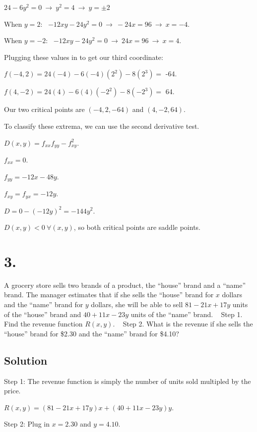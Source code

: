 \documentclass[]{article}
\begin{document}
\(24 - 6y^2 = 0 \ \to \ y^2 = 4 \ \to \ y = \pm 2\)

When \(y = 2\): ~\(-12xy -24y^2 = 0 \ \to \ -24x = 96 \ \to \ x = -4\).

When \(y = -2\): ~\(-12xy -24y^2 = 0 \ \to \ 24x = 96 \ \to \ x = 4\).

Plugging these values in to get our third coordinate:

\(f(-4,2) = 24(-4) - 6(-4)(2^2) - 8(2^3) =\) -64.

\(f(4,-2) = 24(4) - 6(4)(-2^2) - 8(-2^3) =\) 64.

Our two critical points are \((-4,2,-64)\) and \((4,-2,64)\).

To classify these extrema, we can use the second derivative test.

\(D(x,y) = f_{xx}f_{yy} - f_{xy}^2\).

\(f_{xx} = 0\).

\(f_{yy} = -12x - 48y\).

\(f_{xy} = f_{yx} = -12y\).

\(D = 0 - (-12y)^2 = -144y^2\).

\(D(x,y) < 0 \ \forall (x,y)\), so both critical points are saddle
points.

\hypertarget{section-2}{%
\section{3.}\label{section-2}}

A grocery store sells two brands of a product, the ``house'' brand and a
``name'' brand. The manager estimates that if she sells the ``house''
brand for \(x\) dollars and the ``name'' brand for \(y\) dollars, she
will be able to sell \(81 - 21x + 17y\) units of the ``house'' brand and
\(40 + 11x - 23y\) units of the ``name'' brand. ~ Step 1. Find the
revenue function \(R(x, y)\). ~ Step 2. What is the revenue if she sells
the ``house'' brand for \$2.30 and the ``name'' brand for \$4.10?

\hypertarget{solution-2}{%
\subsection{Solution}\label{solution-2}}

Step 1: The revenue function is simply the number of units sold
multipled by the price.

\(R(x,y) = (81 - 21x + 17y)x + (40 + 11x - 23y)y\).

Step 2: Plug in \(x = 2.30\) and \(y = 4.10\).
\end{document}
